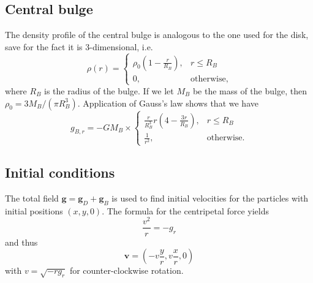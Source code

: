 \subsection{Central bulge}
The density profile of the central bulge is analogous to the one used for the disk, save for the fact it is 3-dimensional, i.e.
\begin{equation*}
    \rho(r) =
    \begin{cases}
        \rho_0\left(1 - \frac{r}{R_B}\right), & r \leq R_B        \\
        0,                                    & \text{otherwise},
    \end{cases}
\end{equation*}
where $R_B$ is the radius of the bulge.
If we let $M_B$ be the mass of the bulge, then $\rho_0 = 3M_B / (\pi R_B^3)$.
Application of Gauss's law shows that we have
\begin{equation*}
    g_{B,r} = -G M_B \times
    \begin{cases}
        \frac{r}{R_B^3}r\left(4 - \frac{3r}{R_B}\right), & r \leq R_B        \\
        \frac{1}{r^2},                                   & \text{otherwise}.
    \end{cases}
\end{equation*}

\subsection{Initial conditions}
The total field $\mathbf{g} = \mathbf{g}_D + \mathbf{g}_B$ is used to find initial velocities for the particles with initial positions $(x, y, 0)$.
The formula for the centripetal force yields
\begin{equation*}
    \frac{v^2}{r} = -g_r
\end{equation*}
and thus
\begin{equation*}
    \mathbf{v} = \left(-v \frac{y}{r}, v\frac{x}{r}, 0\right)
\end{equation*}
with $v = \sqrt{- r g_r}$
for counter-clockwise rotation.
